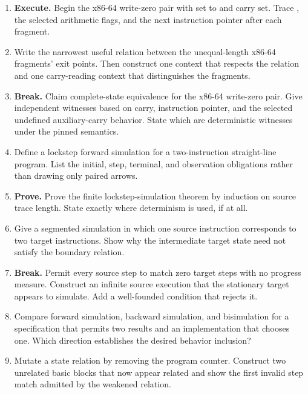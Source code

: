 \begin{enumerate}
\item \textbf{Execute.} Begin the x86-64 write-zero pair with  set
to  and carry set. Trace , the selected
arithmetic flags, and the next instruction pointer after each fragment.

\item Write the narrowest useful relation between the unequal-length x86-64
fragments' exit points. Then construct one context that respects the relation
and one carry-reading context that distinguishes the fragments.

\item \textbf{Break.} Claim complete-state equivalence for the x86-64 write-zero
pair. Give independent witnesses based on carry, instruction pointer, and the
selected undefined auxiliary-carry behavior. State which are deterministic
witnesses under the pinned semantics.

\item Define a lockstep forward simulation for a two-instruction straight-line
program. List the initial, step, terminal, and observation obligations rather
than drawing only paired arrows.

\item \textbf{Prove.} Prove the finite lockstep-simulation theorem by induction
on source trace length. State exactly where determinism is used, if at all.

\item Give a segmented simulation in which one source instruction corresponds
to two target instructions. Show why the intermediate target state need not
satisfy the boundary relation.

\item \textbf{Break.} Permit every source step to match zero target steps with
no progress measure. Construct an infinite source execution that the stationary
target appears to simulate. Add a well-founded condition that rejects it.

\item Compare forward simulation, backward simulation, and bisimulation for a
specification that permits two results and an implementation that chooses one.
Which direction establishes the desired behavior inclusion?

\item Mutate a state relation by removing the program counter. Construct two
unrelated basic blocks that now appear related and show the first invalid step
match admitted by the weakened relation.


\end{enumerate}
